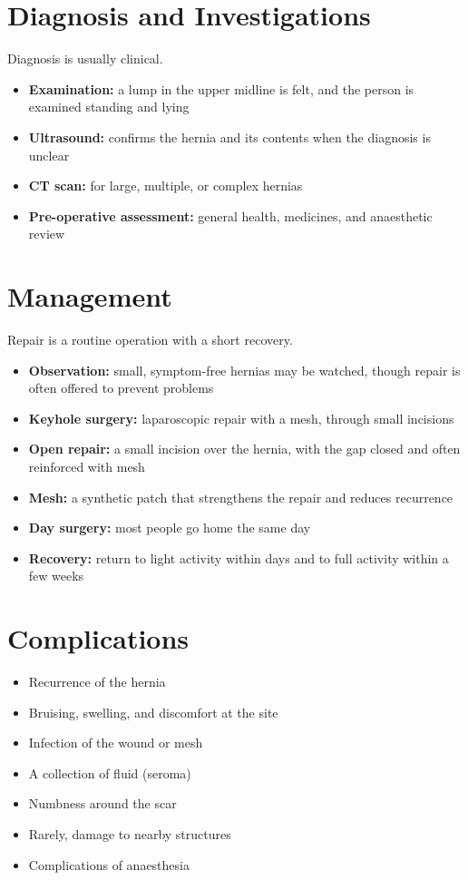 \section*{Diagnosis and Investigations}
Diagnosis is usually clinical.
\begin{itemize}
    \item \textbf{Examination:} a lump in the upper midline is felt, and the person is examined standing and lying
    \item \textbf{Ultrasound:} confirms the hernia and its contents when the diagnosis is unclear
    \item \textbf{CT scan:} for large, multiple, or complex hernias
    \item \textbf{Pre-operative assessment:} general health, medicines, and anaesthetic review
\end{itemize}

\section*{Management}
Repair is a routine operation with a short recovery.
\begin{itemize}
    \item \textbf{Observation:} small, symptom-free hernias may be watched, though repair is often offered to prevent problems
    \item \textbf{Keyhole surgery:} laparoscopic repair with a mesh, through small incisions
    \item \textbf{Open repair:} a small incision over the hernia, with the gap closed and often reinforced with mesh
    \item \textbf{Mesh:} a synthetic patch that strengthens the repair and reduces recurrence
    \item \textbf{Day surgery:} most people go home the same day
    \item \textbf{Recovery:} return to light activity within days and to full activity within a few weeks
\end{itemize}

\section*{Complications}
\begin{itemize}
    \item Recurrence of the hernia
    \item Bruising, swelling, and discomfort at the site
    \item Infection of the wound or mesh
    \item A collection of fluid (seroma)
    \item Numbness around the scar
    \item Rarely, damage to nearby structures
    \item Complications of anaesthesia
\end{itemize}

